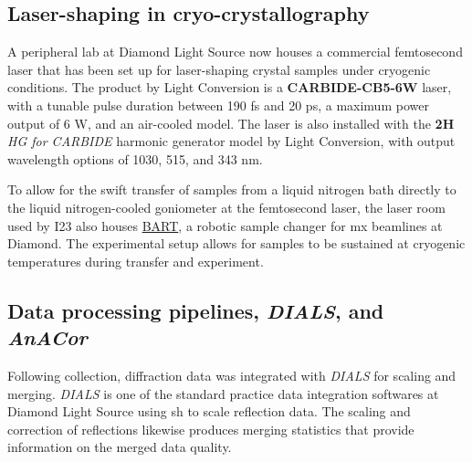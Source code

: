 
\subsection{Laser-shaping in cryo-crystallography}
A peripheral lab at Diamond Light Source now houses a commercial femtosecond laser  that has been set up for laser-shaping crystal samples under cryogenic conditions. The product by Light Conversion is a \textbf{CARBIDE-CB5-6W} laser, with a tunable pulse duration between 190 \unit{fs} and 20 \unit{ps}, a maximum power output of 6 \unit{W}, and an air-cooled model. The laser is also installed with the \textbf{2H} \textit{HG for CARBIDE} harmonic generator model by Light Conversion, with output wavelength options of 1030, 515, and 343 \unit{nm}.%

To allow for the swift transfer of samples from a liquid nitrogen bath directly to the liquid nitrogen-cooled goniometer at the femtosecond laser, the laser room used by I23 also houses \href{https://www.diamond.ac.uk/Home/Corporate-Literature/Annual-Review/Review2015/Villages/Macromolecular-Crystallography-Village/Macromolecular-Crystallography-Village-Developments/BART---the-new-robotic-sample-changer-for-MX-beamlines-at-Diamond.html}{BART}, a robotic sample changer for \ac{mx} beamlines at Diamond. The experimental setup allows for samples to be sustained at cryogenic temperatures during transfer and experiment.

\subsection{Data processing pipelines, \textit{DIALS}, and \textit{AnACor}}

Following collection, diffraction data was integrated with \textit{DIALS} for scaling and merging. \textit{DIALS} is one of the standard practice data integration softwares at Diamond Light Source using \ac{sh} to scale reflection data. The scaling and correction of reflections likewise produces merging statistics that provide information on the merged data quality.%

